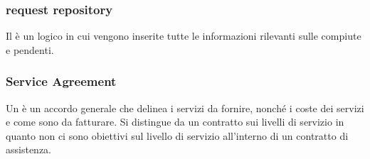 \subsubsection{request repository}
Il  è un  logico in cui vengono inserite tutte le informazioni rilevanti sulle  compiute e pendenti.

\subsubsection{Service Agreement}
Un  è un accordo generale che delinea i servizi da fornire, nonché i coste dei servizi e come sono da fatturare. Si distingue da un contratto sui livelli di servizio in quanto non ci sono obiettivi sul livello di servizio all'interno di un contratto di assistenza.